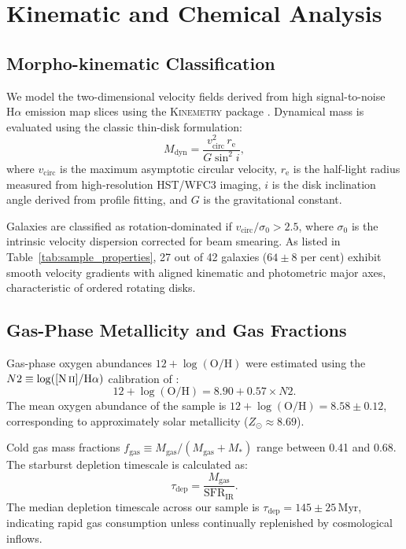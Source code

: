 \documentclass[fleqn,usenatbib]{mnras}
\begin{document}
\section{Kinematic and Chemical Analysis}
\label{sec:analysis}

\subsection{Morpho-kinematic Classification}
We model the two-dimensional velocity fields derived from high signal-to-noise $\mathrm{H}\alpha$ emission map slices using the \textsc{Kinemetry} package \citep{Krajnovic2006}. Dynamical mass is evaluated using the classic thin-disk formulation:
\begin{equation}
M_{\mathrm{dyn}} = \frac{v_{\mathrm{circ}}^2 \, r_{\mathrm{e}}}{G \sin^2 i},
\label{eq:mdyn}
\end{equation}
where $v_{\mathrm{circ}}$ is the maximum asymptotic circular velocity, $r_{\mathrm{e}}$ is the half-light radius measured from high-resolution HST/WFC3 imaging, $i$ is the disk inclination angle derived from profile fitting, and $G$ is the gravitational constant.

Galaxies are classified as rotation-dominated if $v_{\mathrm{circ}}/\sigma_0 > 2.5$, where $\sigma_0$ is the intrinsic velocity dispersion corrected for beam smearing. As listed in Table~\ref{tab:sample_properties}, 27 out of 42 galaxies ($64 \pm 8$ per cent) exhibit smooth velocity gradients with aligned kinematic and photometric major axes, characteristic of ordered rotating disks.

\subsection{Gas-Phase Metallicity and Gas Fractions}
Gas-phase oxygen abundances $12 + \log(\mathrm{O/H})$ were estimated using the $N2 \equiv \log([\mathrm{N\,\textsc{ii}}]/\mathrm{H}\alpha)$ calibration of \citet{Pettini2004}:
\begin{equation}
12 + \log(\mathrm{O/H}) = 8.90 + 0.57 \times N2.
\label{eq:n2}
\end{equation}
The mean oxygen abundance of the sample is $12 + \log(\mathrm{O/H}) = 8.58 \pm 0.12$, corresponding to approximately solar metallicity ($Z_\odot \approx 8.69$).

Cold gas mass fractions $f_{\mathrm{gas}} \equiv M_{\mathrm{gas}} / (M_{\mathrm{gas}} + M_*)$ range between 0.41 and 0.68. The starburst depletion timescale is calculated as:
\begin{equation}
\tau_{\mathrm{dep}} = \frac{M_{\mathrm{gas}}}{\mathrm{SFR}_{\mathrm{IR}}}.
\label{eq:tdep}
\end{equation}
The median depletion timescale across our sample is $\tau_{\mathrm{dep}} = 145 \pm 25\,\mathrm{Myr}$, indicating rapid gas consumption unless continually replenished by cosmological inflows.
\end{document}
